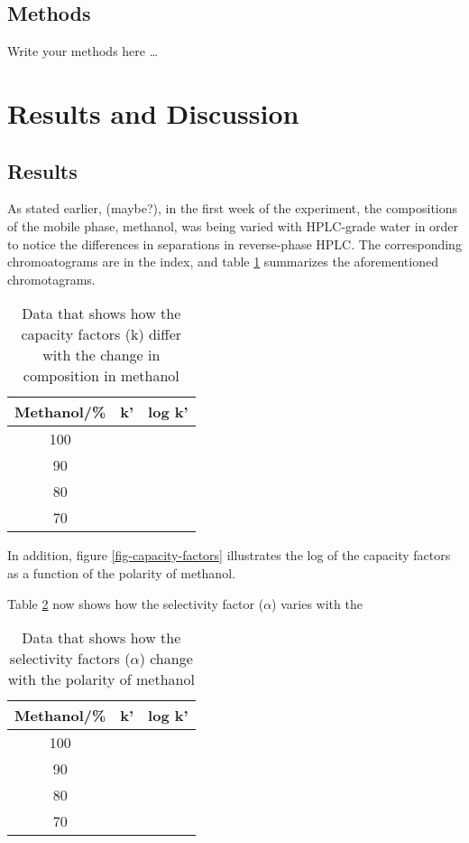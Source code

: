 \documentclass[a4paper, 12pt]{article}
\begin{document}
\subsection{Methods}
Write your methods here \dots


\section{Results and Discussion}

\subsection{Results}
As stated earlier, (maybe?), in the first week of the experiment, the compositions of the mobile phase, methanol, was being varied with HPLC-grade water in order to notice the differences in separations in reverse-phase HPLC. The corresponding chromoatograms are in the index, and table \ref{tab-capacity-factors} summarizes the aforementioned chromotagrams.

\begin{table}[h!]
	\centering
	\begin{tabular}{|c|c|c|}
		\hline
		Methanol/\% & k' & log k' \\
		\hline
		100 & & \\
		\hline
		90 & & \\
		\hline
		80 & & \\
		\hline
		70 & & \\
		\hline
	\end{tabular}
	\caption{Data that shows how the capacity factors (k) differ with the change in composition in methanol}
	\label{tab-capacity-factors}
\end{table}

In addition, figure \ref{fig-capacity-factors} illustrates the log of the capacity factors as a function of the polarity of methanol.

Table \ref{tab-selectivity} now shows how the selectivity factor ($\alpha$) varies with the 

\begin{table}[h!]
	\centering
	\begin{tabular}{|c|c|c|}
		\hline
		Methanol/\% & k' & log k' \\
		\hline
		100 & & \\
		\hline
		90 & & \\
		\hline
		80 & & \\
		\hline
		70 & & \\
		\hline
	\end{tabular}
	\caption{Data that shows how the selectivity factors ($\alpha$) change with the polarity of methanol}
	\label{tab-selectivity}
\end{table}
\end{document}
